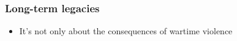\documentclass[aspectratio=43]{beamer}
\begin{document}


  
  



\begin{frame}
\frametitle{Long-term legacies}
\centering

\begin{itemize}
  \item It's not only about the consequences of wartime violence
\end{itemize}

\end{frame}




  
\end{document}
